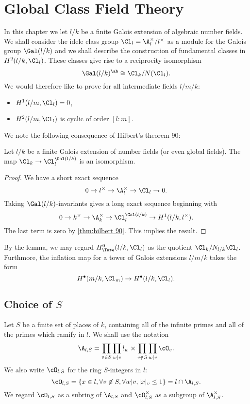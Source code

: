 \chapter{Global Class Field Theory}

In this chapter we let $l/k$ be a finite Galois extension of
algebraic number fields. We shall consider the idele class group $\Cl_l = \A_l^\times / l^\times$
as a module for the Galois group $\Gal(l/k)$ and we shall describe the construction of
fundamental classes in $H^2(l/k, \Cl_l)$.
These classes give rise to a reciprocity isomorphism
\[
	\Gal(l/k)^{\ab} \cong \Cl_k / N(\Cl_l).
\]
We would therefore like to prove for all intermediate fields $l / m / k$:
\begin{itemize}
	\item
	$H^1(l/m, \Cl_l) = 0$,
	\item
	$H^2(l/m, \Cl_l)$ is cyclic of order $[l:m]$.
\end{itemize}

We note the following consequence of Hilbert's theorem 90:

\begin{lemma} \label{lem:idele class invariants}
	Let $l/k$ be a finite Galois extension of number fields (or even global fields).
	The map $\Cl_k \to \Cl_l ^ {\Gal(l/k)}$ is an isomorphism.
\end{lemma}

\begin{proof}
	We have a short exact sequence
	\[
		0 \to l^\times \to \A_l^\times \to \Cl_l \to 0.
	\]
	Taking $\Gal(l/k)$-invariants gives a long exact sequence beginning with
	\[
		0 \to k^\times \to \A_k^\times \to \Cl_l^{\Gal(l/k)} \to H^1(l/k, l^\times).
	\]
	The last term is zero by \ref{thm:hilbert 90}. This implies the result.
\end{proof}

By the lemma, we may regard $H^0_{\Tate}(l/k,\Cl_l)$ as the quotient
$\Cl_k / N_{l/k} \Cl_l$.
Furthmore, the inflation map for a tower of Galois extensions $l/m/k$ takes the form
\[
	H^\bullet(m/k, \Cl_m) \to H^\bullet(l/k, \Cl_l).
\]







\section{Choice of \texorpdfstring{$S$}{S}}

Let $S$ be a finite set of places of $k$, containing all of the infinite primes and all
of the primes which ramify in $l$.
We shall use the notation
\[
	\A_{l,S} = \prod_{v \in S} \prod_{w | v} l_w \times \prod_{v \notin S} \prod_{w | v} \cO_v.
\]
We also write $\cO_{l,S}$ for the ring $S$-integers in $l$:
\[
	\cO_{l,S} = \{x \in l, \forall v \not\in S, \forall w | v, |x|_v \le 1\} = l \cap \A_{l,S}.
\]
We regard $\cO_{l,S}$ as a subring of $\A_{l,S}$ and
$\cO_{l,S}^\times$ as a subgroup of $\A_{l,S}^\times$.

